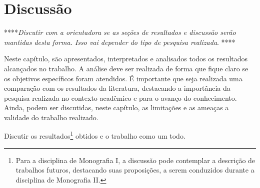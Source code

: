 \chapter{Discussão} \label{discussao}

****\textit{Discutir com a orientadora se as seções de resultados e discussão serão mantidas desta forma. Isso vai depender do tipo de pesquisa realizada}. ****

Neste capítulo, são apresentados, interpretados e analisados todos os resultados alcançados no trabalho. A análise deve ser realizada de forma que fique claro se os objetivos específicos foram atendidos. É importante que seja realizada uma comparação com os resultados da literatura, destacando a importância da pesquisa realizada no contexto acadêmico e para o avanço do conhecimento. Ainda, podem ser discutidas, neste capítulo, as limitações e as ameaças a validade do trabalho realizado.


Discutir os resultados\footnote{Para a disciplina de Monografia I, a discussão pode contemplar a descrição de trabalhos futuros, destacando suas proposições, a serem conduzidos durante a disciplina de Monografia II.} obtidos e o trabalho como um todo.

